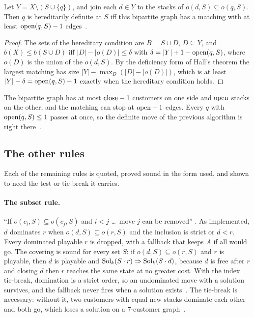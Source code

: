 \begin{theorem}\label{thm:matching}
Let $Y=X\setminus(S\cup\{q\})$, and join each $d\in Y$ to the stacks of
$o(d,S)\subseteq o(q,S)$. Then $q$ is hereditarily definite at $S$ iff this
bipartite graph has a matching with at least $\mathrm{open}(q,S)-1$ edges~.
\end{theorem}
\begin{proof}
The sets of the hereditary condition are $B=S\cup D$, $D\subseteq Y$, and
$b(X)\le b(S\cup D)$ iff $|D|-|o(D)|\le\delta$ with
$\delta=|Y|+1-\mathrm{open}(q,S)$, where $o(D)$ is the union of the $o(d,S)$. By the
deficiency form of Hall's theorem the largest matching has size
$|Y|-\max_D(|D|-|o(D)|)$, which is at least $|Y|-\delta=\mathrm{open}(q,S)-1$ exactly
when the hereditary condition holds.
\end{proof}

The bipartite graph has at most $\mathrm{close}-1$ customers on one side and $\mathrm{open}$
stacks on the other, and the matching can stop at $\mathrm{open}-1$ edges. Every $q$
with $\mathrm{open}(q,S)\le1$ passes at once, so the definite move of the previous algorithm is right
there~.

\subsection{The other rules}
\label{sec:other-rules}

Each of the remaining rules is quoted, proved sound in the form used, and
shown to need the test or tie-break it carries.

\paragraph{The subset rule.} ``If $o(c_i,S)\subseteq o(c_j,S)$ and $i<j$ \dots\
move $j$ can be removed'' \citep[\S2, p.~5]{ChuStuckey2009}. As implemented,
$d$ dominates $r$ when $o(d,S)\subseteq o(r,S)$ and the inclusion is strict or
$d<r$. Every dominated playable $r$ is dropped, with a fallback that keeps $A$
if all would go. The covering is sound for every set $S$: if
$o(d,S)\subseteq o(r,S)$ and $r$ is playable, then $d$ is playable and
$\mathrm{Sol}_k(S\cdot r)\Rightarrow \mathrm{Sol}_k(S\cdot d)$, because $d$ is free after $r$
and closing $d$ then $r$ reaches the same state at no greater cost. With the
index tie-break, domination is a strict order, so an undominated move with a
solution survives, and the fallback never fires when a solution
exists~. The tie-break is necessary: without it, two customers
with equal new stacks dominate each other and both go, which loses a solution
on a 7-customer graph~\leanref{tiebreak}.

